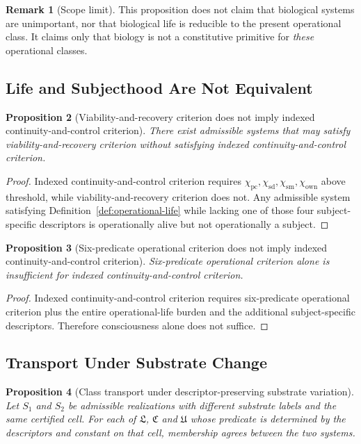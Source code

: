 \documentclass[11pt,a4paper]{article}
\newtheorem{proposition}{Proposition}[section]
\theoremstyle{definition}
\newtheorem{remark}[proposition]{Remark}
\newcommand{\Priv}{\chi_{\mathrm{pc}}}
\newcommand{\SelfDisc}{\chi_{\mathrm{sd}}}
\newcommand{\SelfModel}{\chi_{\mathrm{sm}}}
\newcommand{\Own}{\chi_{\mathrm{own}}}
\newcommand{\LifeClass}{\mathfrak{L}}
\newcommand{\ConClass}{\mathfrak{C}}
\newcommand{\SubClass}{\mathfrak{U}}
\begin{document}
\begin{remark}[Scope limit]
This proposition does not claim that biological systems are unimportant, nor that biological life is reducible to the present operational class. It claims only that biology is not a constitutive primitive for \emph{these} operational classes.
\end{remark}

\subsection{Life and Subjecthood Are Not Equivalent}
\begin{proposition}[Viability-and-recovery criterion does not imply indexed continuity-and-control criterion]
There exist admissible systems that may satisfy viability-and-recovery criterion without satisfying indexed continuity-and-control criterion.
\end{proposition}

\begin{proof}
Indexed continuity-and-control criterion requires $\Priv,\SelfDisc,\SelfModel,\Own$ above threshold, while viability-and-recovery criterion does not. Any admissible system satisfying Definition~\ref{def:operational-life} while lacking one of those four subject-specific descriptors is operationally alive but not operationally a subject.
\end{proof}

\begin{proposition}[Six-predicate operational criterion does not imply indexed continuity-and-control criterion]
Six-predicate operational criterion alone is insufficient for indexed continuity-and-control criterion.
\end{proposition}

\begin{proof}
Indexed continuity-and-control criterion requires six-predicate operational criterion plus the entire operational-life burden and the additional subject-specific descriptors. Therefore consciousness alone does not suffice.
\end{proof}

\subsection{Transport Under Substrate Change}
\begin{proposition}[Class transport under descriptor-preserving substrate variation]
Let $S_1$ and $S_2$ be admissible realizations with different substrate labels and the same certified cell. For each of $\LifeClass$, $\ConClass$ and $\SubClass$ whose predicate is determined by the descriptors and constant on that cell, membership agrees between the two systems.
\end{proposition}
\end{document}
